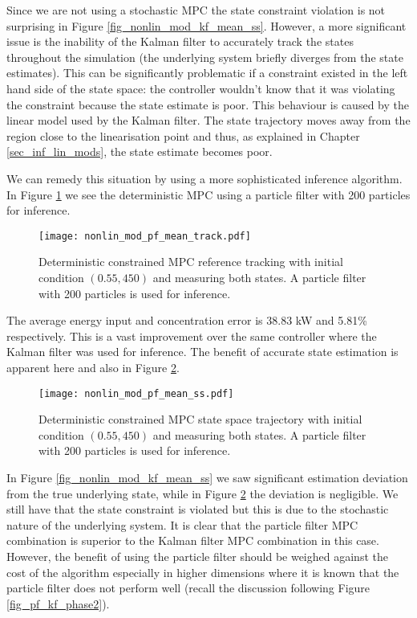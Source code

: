 Since we are not using a stochastic MPC the state constraint violation is not surprising in Figure \ref{fig_nonlin_mod_kf_mean_ss}. However, a more significant issue is the inability of the Kalman filter to accurately track the states throughout the simulation (the underlying system briefly diverges from the state estimates). This can be significantly problematic if a constraint existed in the left hand side of the state space: the controller wouldn't know that it was violating the constraint because the state estimate is poor. This behaviour is caused by the linear model used by the Kalman filter. The state trajectory moves away from the region close to the linearisation point and thus, as explained in Chapter \ref{sec_inf_lin_mods}, the state estimate becomes poor.

We can remedy this situation by using a more sophisticated inference algorithm. In Figure \ref{fig_nonlin_mod_pf_mean_track} we see the deterministic MPC using a particle filter with 200 particles for inference. 
\begin{figure}[H] 
\centering
\texttt{[image: nonlin\_mod\_pf\_mean\_track.pdf]}
\caption{Deterministic constrained MPC reference tracking with initial condition $(0.55, 450)$ and measuring both states. A particle filter with 200 particles is used for inference.}
\label{fig_nonlin_mod_pf_mean_track}
\end{figure} 
The average energy input and concentration error is 38.83 kW and 5.81\% respectively. This is a vast improvement over the same controller where the Kalman filter was used for inference. The benefit of accurate state estimation is apparent here and also in Figure \ref{fig_nonlin_mod_pf_mean_ss}.
\begin{figure}[H] 
\centering
\texttt{[image: nonlin\_mod\_pf\_mean\_ss.pdf]}
\caption{Deterministic constrained MPC state space trajectory with initial condition $(0.55, 450)$ and measuring both states. A particle filter with 200 particles is used for inference.}
\label{fig_nonlin_mod_pf_mean_ss}
\end{figure}
In Figure \ref{fig_nonlin_mod_kf_mean_ss} we saw significant estimation deviation from the true underlying state, while in Figure \ref{fig_nonlin_mod_pf_mean_ss} the deviation is negligible. We still have that the state constraint is violated but this is due to the stochastic nature of the underlying system. It is clear that the particle filter MPC combination is superior to the Kalman filter MPC combination in this case. However, the benefit of using the particle filter should be weighed against the cost of the algorithm especially in higher dimensions where it is known that the particle filter does not perform well (recall the discussion following Figure \ref{fig_pf_kf_phase2}).

